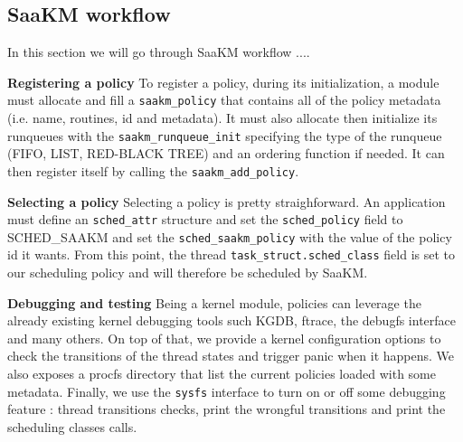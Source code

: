 \subsection{SaaKM workflow}

\par In this section we will go through SaaKM workflow ....\newline

\par \textbf{Registering a policy} To register a policy, during its initialization, a module must allocate and fill a \texttt{saakm\_policy} that contains all of the policy metadata (i.e. name, routines, id and metadata). It must also allocate then initialize its runqueues with the \texttt{saakm\_runqueue\_init} specifying the type of the runqueue (FIFO, LIST, RED-BLACK TREE) and an ordering function if needed. It can then register itself by calling the \texttt{saakm\_add\_policy}. \newline

\par \textbf{Selecting a policy} Selecting a policy is pretty straighforward. An application must define an \texttt{sched\_attr} structure and set the \texttt{sched\_policy} field to SCHED\_SAAKM and set the \texttt{sched\_saakm\_policy} with the value of the policy id it wants. From this point, the thread \texttt{task\_struct.sched\_class} field is set to our scheduling policy and will therefore be scheduled by SaaKM. \newline

\par \textbf{Debugging and testing} Being a kernel module, policies can leverage the already existing kernel debugging tools such KGDB, ftrace, the debugfs interface and many others. On top of that, we provide a kernel configuration options to check the transitions of the thread states and trigger panic when it happens. We also exposes a procfs directory that list the current policies loaded with some metadata. Finally, we use the \texttt{sysfs} interface to turn on or off some debugging feature : thread transitions checks, print the wrongful transitions and print the scheduling classes calls. \newline



